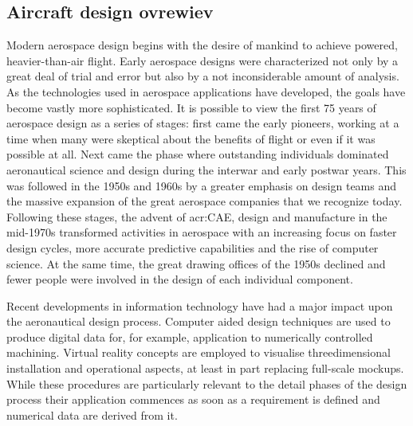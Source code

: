 \subsection{Aircraft design ovrewiev}
Modern aerospace design begins with the desire of mankind to achieve powered, heavier-than-air flight. Early aerospace designs were characterized not only by a great deal of trial and error but also by a not inconsiderable amount of analysis. As the technologies used in aerospace applications
have developed, the goals have become vastly more sophisticated. It is possible to view the first 75 years of aerospace design as a series of stages: first came the early pioneers, working at a time when many were skeptical about the benefits of flight or even if it was possible at all. Next came the phase where outstanding individuals dominated aeronautical science and design during the interwar and early postwar years. This was followed in the 1950s and 1960s by a greater emphasis on design teams and the massive expansion of the great aerospace companies that we recognize today. Following these stages, the advent of \gls{acr:CAE}, design and  manufacture in the mid-1970s transformed activities in aerospace with an increasing focus on faster design cycles, more accurate predictive capabilities and the rise of computer science. At the same time, the great drawing offices of the 1950s declined and fewer people were involved in the design of each individual component.\cite{gambardella}

\bigskip
\noindent
Recent developments in information technology have had a major impact upon the aeronautical design process. Computer aided design techniques are used to produce digital data for, for example, application to numerically controlled machining. Virtual reality concepts are employed to visualise threedimensional installation and operational aspects, at least in part replacing full-scale mockups. While these procedures are particularly relevant to the detail phases of the design process their application commences as soon as a requirement is defined and numerical data are derived from it.\cite{howe2000aircraft}

